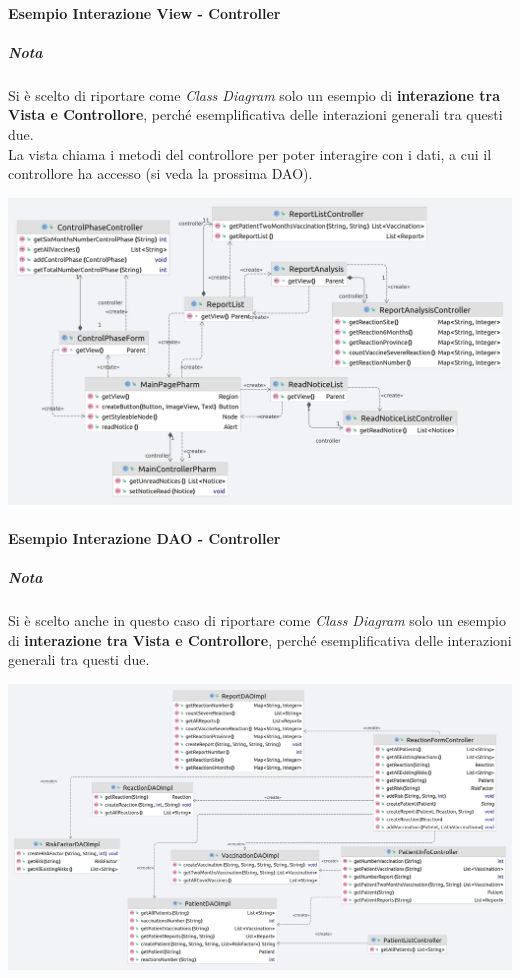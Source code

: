 \documentclass[11pt]{article}
\begin{document}
            \paragraph*{Esempio Interazione View - Controller}
                \subparagraph*{Nota} Si è scelto di riportare come \textit{Class Diagram} solo un esempio di \textbf{interazione tra Vista e Controllore}, perché esemplificativa delle interazioni generali tra questi due.\\
                La vista chiama i metodi del controllore per poter interagire con i dati, a cui il controllore ha accesso (si veda la prossima DAO).
                \begin{center}
                    \includegraphics[width=1\textwidth]{pictures/ExampleControlViewInteraction.png}
                \end{center}
        \newpage
            \paragraph*{Esempio Interazione DAO - Controller}
            \subparagraph*{Nota} Si è scelto anche in questo caso di riportare come \textit{Class Diagram} solo un esempio di \textbf{interazione tra Vista e Controllore}, perché esemplificativa delle interazioni generali tra questi due.
                \begin{center}
                    \includegraphics[width=1\textwidth]{pictures/ControllerDati.png}
                \end{center}
\end{document}

